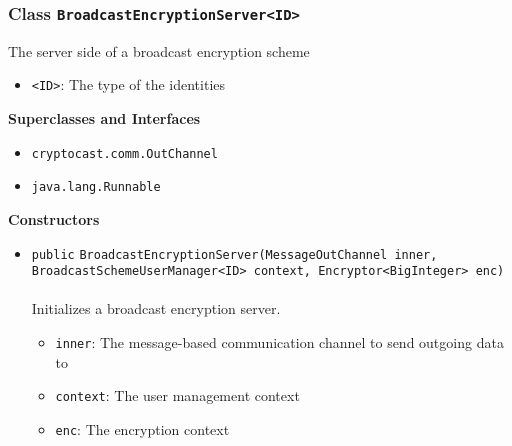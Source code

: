\subsubsection{Class \lstinline|BroadcastEncryptionServer<ID>|}
The server side of a broadcast encryption scheme \\
\noindent\begin{minipage}[t]{5cm}
\vspace{0.3em}
\hspace*{2em}
\vspace{0.3em}
\end{minipage}

\begin{itemize}
\item \lstinline|<ID>|: The type of the identities
\end{itemize}


\textbf{\sffamily Superclasses and Interfaces}
\begin{itemize}
\item \lstinline|cryptocast.comm.OutChannel|
\item \lstinline|java.lang.Runnable|
\end{itemize}


\textbf{\sffamily Constructors}
\begin{itemize}
\item \lstinline|public| \lstinline|BroadcastEncryptionServer|\lstinline|(MessageOutChannel inner, BroadcastSchemeUserManager<ID> context, Encryptor<BigInteger> enc)|\\ \\[-0.6em]
Initializes a broadcast encryption server.
\begin{itemize}
\item \lstinline|inner|: The message-based communication channel to send outgoing data to
\item \lstinline|context|: The user management context
\item \lstinline|enc|: The encryption context
\end{itemize}



\end{itemize}


